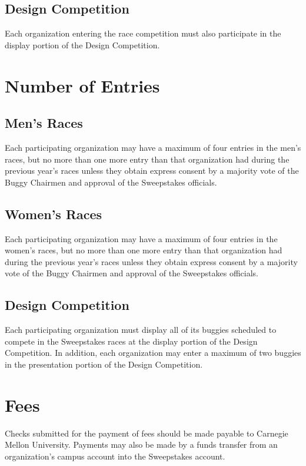 \subsection{Design Competition}
Each organization entering the race competition must also participate in the display portion of the Design Competition.

\section{Number of Entries}

\subsection{Men's Races}

Each participating organization may have a maximum of four entries in the men's races, but no more than one more entry than that organization had during the previous year's races unless they obtain express consent by a majority vote of the Buggy Chairmen and approval of the Sweepstakes officials.

\subsection{Women's Races}

Each participating organization may have a maximum of four entries in the women's races, but no more than one more entry than that organization had during the previous year's races unless they obtain express consent by a majority vote of the Buggy Chairmen and approval of the Sweepstakes officials.

\subsection{Design Competition}

Each participating organization must display all of its buggies scheduled to compete in the Sweepstakes races at the display portion of the Design Competition. In addition, each organization may enter a maximum of two buggies in the presentation portion of the Design Competition.

\section{Fees}

Checks submitted for the payment of fees should be made payable to Carnegie Mellon University. Payments may also be made by a funds transfer from an organization's campus account into the Sweepstakes account.

